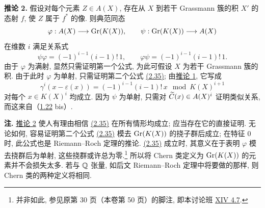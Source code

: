 \textbf{推论 2.} 假设对每个元素 $Z\in A(X)$, 存在从 $X$ 到若干 Grassmann 簇的积 $X'$ 的态射 $f$, 使 $Z$ 属于 $f^*$ 的像. 则典范同态
\[
 \varphi:A(X)\longrightarrow \operatorname{Gr}(K(X)),\qquad
 \psi:\operatorname{Gr}(K(X))\longrightarrow A(X)
\]
在维数 $i$ 满足关系式
\begin{equation}\tag{2.35}
 \psi\varphi=(-1)^{i-1}(i-1)!\,1,
 \qquad
 \varphi\psi=(-1)^{i-1}(i-1)!\,1.
\end{equation}
由于 $\varphi$ 为满射, 显然只需证明第一个公式, 为此可假设 $X$ 为若干 Grassmann 簇的积. 由于此时 $\varphi$ 为单射, 只需证明第二个公式 \hyperlink{sga6.e00.eq.2-35}{(2.35)}; 由\hyperlink{sga6.e00.cor.1.occ3}{推论 1}, 它写成
\[
 \gamma^i(x-\varepsilon(x))=(-1)^{i-1}(i-1)!\,x\mod K(X)^{i+1}
\]
对每个 $x\in K(X)^i$ 均成立. 因为 $\psi$ 为单射, 只需对 $\widetilde C(x)\in A(X)^i$ 证明类似关系, 而这来自（\hyperlink{sga6.e00.eq.1-22}{1.22} bis）.

\textbf{注.} \hyperlink{sga6.e00.cor.2.occ4}{推论 2} 使人有理由相信 \hyperlink{sga6.e00.eq.2-35}{(2.35)} 在所有情形均成立; 应当存在它的直接证明. 无论如何, 容易证明第二个公式 \hyperlink{sga6.e00.eq.2-35}{(2.35)} 模去 $\operatorname{Gr}(K(X))$ 的挠子群后成立; 在特征 $0$ 时, 此公式也是 Riemann--Roch 定理的推论. \hyperlink{sga6.e00.eq.2-35}{(2.35)} 成立时, 其意义在于表明 $\varphi$ 模去挠群后为单射, 这些挠群或许总为零.\footnote{并非如此, 参见原第 30 页（本卷第 50 页）的脚注, 即本讨论班 \hyperlink{sga6.e14.para.4-7}{XIV 4.7}.} 所以将 Chern 类定义为 $\operatorname{Gr}(K(X))$ 的元素并不会损失太多. 若与 $\mathbb Q$ 张量, 如后文 Riemann--Roch 定理中将要做的那样, 则 Chern 类的两种定义将相同.

